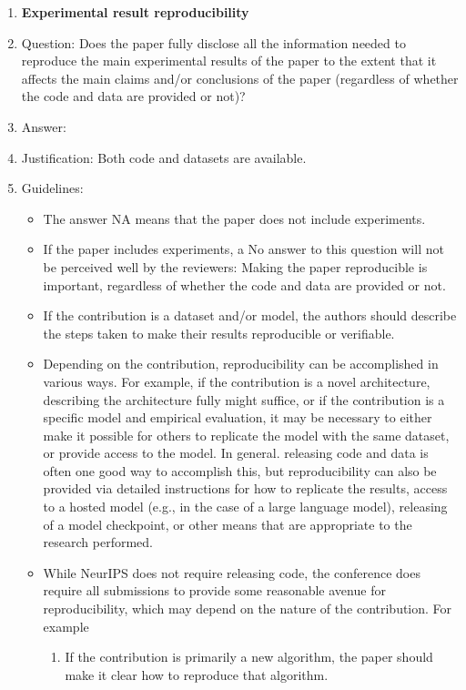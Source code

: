 \documentclass{article}
\begin{document}
\begin{enumerate}
    \item {\bf Experimental result reproducibility}
    \item[] Question: Does the paper fully disclose all the information needed to reproduce the main experimental results of the paper to the extent that it affects the main claims and/or conclusions of the paper (regardless of whether the code and data are provided or not)?
    \item[] Answer: \answerYes{} %
    \item[] Justification: Both code and datasets are available.
    \item[] Guidelines:
    \begin{itemize}
        \item The answer NA means that the paper does not include experiments.
        \item If the paper includes experiments, a No answer to this question will not be perceived well by the reviewers: Making the paper reproducible is important, regardless of whether the code and data are provided or not.
        \item If the contribution is a dataset and/or model, the authors should describe the steps taken to make their results reproducible or verifiable. 
        \item Depending on the contribution, reproducibility can be accomplished in various ways. For example, if the contribution is a novel architecture, describing the architecture fully might suffice, or if the contribution is a specific model and empirical evaluation, it may be necessary to either make it possible for others to replicate the model with the same dataset, or provide access to the model. In general. releasing code and data is often one good way to accomplish this, but reproducibility can also be provided via detailed instructions for how to replicate the results, access to a hosted model (e.g., in the case of a large language model), releasing of a model checkpoint, or other means that are appropriate to the research performed.
        \item While NeurIPS does not require releasing code, the conference does require all submissions to provide some reasonable avenue for reproducibility, which may depend on the nature of the contribution. For example
        \begin{enumerate}
            \item If the contribution is primarily a new algorithm, the paper should make it clear how to reproduce that algorithm.

\end{enumerate}
\end{itemize}
\end{enumerate}
\end{document}
